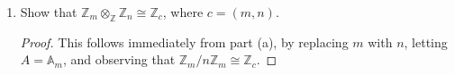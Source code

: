 \documentclass{article}
\begin{document}
\begin{enumerate}[label={(\alph*)}]
    \item Show that $\mathbb{Z}_m\otimes_\mathbb{Z}\mathbb{Z}_n
      \cong\mathbb{Z}_c$, where $c=(m,n)$.
      \begin{proof}
        This follows immediately from part (a), by replacing $m$ with $n$,
        letting $A=\mathbb{A}_m$, and observing that
        $\mathbb{Z}_m/n\mathbb{Z}_m\cong \mathbb{Z}_c$.






\end{proof}
\end{enumerate}
\end{document}
